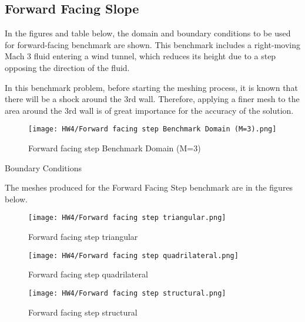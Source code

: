 \documentclass[a4paper, 12pt]{article}
\begin{document}
\subsection{Forward Facing Slope}
In the figures and table below, the domain and boundary conditions to be used for forward-facing benchmark are shown. This benchmark includes a right-moving Mach 3 fluid entering a wind tunnel, which reduces its height due to a step opposing the direction of the fluid. \par
In this benchmark problem, before starting the meshing process, it is known that there will be a shock around the 3rd wall. Therefore, applying a finer mesh to the area around the 3rd wall is of great importance for the accuracy of the solution. 
\begin{figure}[H]
    \centering
    \texttt{[image: HW4/Forward facing step Benchmark Domain (M=3).png]}
    \caption{Forward facing step Benchmark Domain (M=3)}
\end{figure}

\begin{table}[H]
    \renewcommand\baselinestretch{1.1}\selectfont
    \centering
    \mbox{}
    \caption{Boundary Conditions}
\end{table}

The meshes produced for the Forward Facing Step benchmark are in the figures below.

\begin{figure}[H]
    \centering
    \texttt{[image: HW4/Forward facing step triangular.png]}
    \caption{Forward facing step triangular}
\end{figure}
\begin{figure}[H]
    \centering
    \texttt{[image: HW4/Forward facing step quadrilateral.png]}
    \caption{Forward facing step quadrilateral}
\end{figure}
\begin{figure}[H]
    \centering
    \texttt{[image: HW4/Forward facing step structural.png]}
    \caption{Forward facing step structural}
\end{figure}
\end{document}
